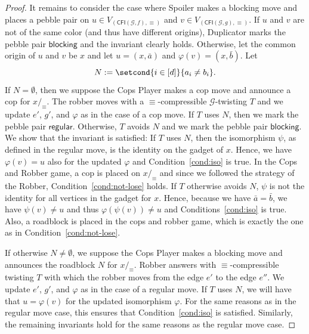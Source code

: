 \documentclass[10pt,a4paper]{article}
\newcommand{\regular}{\mathsf{regular}}
\newcommand{\blocking}{\mathsf{blocking}}
\renewcommand{\phi}{\varphi}
\newcommand{\comp}{\equiv}
\newcommand{\CFIsym}{\mathsf{CFI}}
\newcommand{\CFI}[1]{\CFIsym(#1)}
\newcommand{\precompCFI}[2]{{(\CFI{#1},#2)}}
\newcommand{\tup}[1]{\bar{#1}}
\newcommand{\graphG}{\mathcal{G}}
\begin{document}
\begin{proof}
        It remains to consider the case where Spoiler makes a blocking move
        and places a pebble pair on  $u \in V_{\precompCFI{\graphG,f}{\comp}}$
        and $v \in V_{\precompCFI{\graphG,g}{\comp}}$.
       	If $u$ and $v$ are not of the same color (and thus have different origins),
        Duplicator marks the pebble pair $\blocking$ and the invariant clearly holds.
      	Otherwise, let the common origin of $u$ and $v$ be $x$
      	and let $u=(x,\tup{a})$ and $\phi(v)=(x, \tup{b})$.
      	Let \[N:=\setcond{i \in [d]} { a_i \neq b_i}.\]
      	If $N = \emptyset$, then we suppose the Cops Player makes a cop move and
      	announce a cop for $x/_\comp$.
      	The robber moves with a $\comp$-compressible $\graphG$-twisting $T$
      	and we update $e'$, $g'$, and $\phi$ as in the case of a cop move.
      	If $T$ uses $N$, then we mark the pebble pair $\regular$.
      	Otherwise, $T$ avoids $N$ and we mark the pebble pair $\blocking$.
      	We show that the invariant is satisfied:
      	If $T$ uses $N$,
      	then the isomorphism $\psi$, as defined in the regular move,
      	is the identity on the gadget of $x$.
      	Hence, we have $\phi(v) = u$ also for the updated $\phi$
      	and 
      	Condition~\ref{cond:iso} is true.
      	In the Cops and Robber game, a cop is placed on $x/_\comp$ and since we followed the strategy of the Robber, Condition~\ref{cond:not-lose} holds.
      	If $T$ otherwise avoids $N$,
      	$\psi$ is not the identity for all vertices in the gadget for $x$.
      	Hence, because we have $\tup{a} = \tup{b}$,
      	we have $\psi(v) \neq u$ and thus $\phi(\psi(v)) \neq u$
      	and 
      	Conditions~\ref{cond:iso} is true.
      	Also, a roadblock is placed in the cops and robber game,
      	which is exactly the one as in Condition~\ref{cond:not-lose}.
      	
      	If otherwise $N\neq \emptyset$,
      	we suppose the Cops Player makes a blocking move
      	and announces the roadblock $N$
      	for $x/_\comp$.
      	Robber answers with $\comp$-compressible twisting
      	$T$ with which the robber moves
      	from the edge $e'$ to the edge $e''$.
      	We update $e'$, $g'$, and $\phi$ as in the case of a regular move.
      	If $T$ uses $N$,
      	we will have that $u = \phi(v)$ for the updated isomorphism $\phi$.
      	For the same reasons as in the 
%
      	 regular move case,
      	this ensures that Condition~\ref{cond:iso} is satisfied.
      	Similarly, the remaining invariants hold for the same reasons as the 
      	regular move case.
      	

\end{proof}
\end{document}
